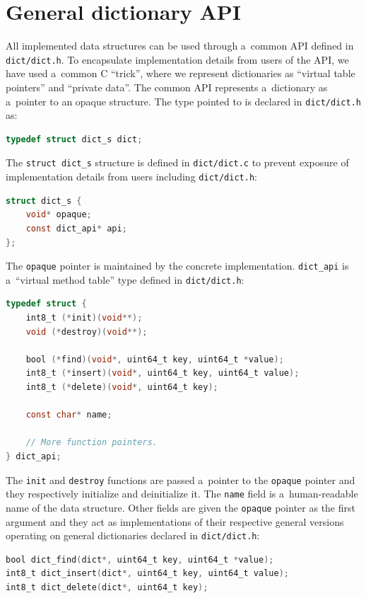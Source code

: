 \section{General dictionary API}
All implemented data structures can be used through a~common API defined
in \texttt{dict/dict.h}. To encapsulate implementation details from
users of the API, we have used a~common C ``trick'', where we represent
dictionaries as ``virtual table pointers'' and ``private data''.
The common API represents a~dictionary as a~pointer to an opaque structure.
The type pointed to is declared in \texttt{dict/dict.h} as:
\begin{lstlisting}[language=C]
typedef struct dict_s dict;
\end{lstlisting}

The \texttt{struct dict\_s} structure is defined in \texttt{dict/dict.c}
to prevent exposure of implementation details from users including
\texttt{dict/dict.h}:
\begin{lstlisting}[language=C]
struct dict_s {
	void* opaque;
	const dict_api* api;
};
\end{lstlisting}

The \texttt{opaque} pointer is maintained by the concrete implementation.
\texttt{dict\_api} is a~``virtual method table'' type defined in
\texttt{dict/dict.h}:

\begin{lstlisting}[language=C]
typedef struct {
	int8_t (*init)(void**);
	void (*destroy)(void**);

	bool (*find)(void*, uint64_t key, uint64_t *value);
	int8_t (*insert)(void*, uint64_t key, uint64_t value);
	int8_t (*delete)(void*, uint64_t key);

	const char* name;

	// More function pointers.
} dict_api;
\end{lstlisting}

The \texttt{init} and \texttt{destroy} functions are passed a~pointer to the
\texttt{opaque} pointer and they respectively initialize and deinitialize it.
The \texttt{name} field is a~human-readable name of the data structure.
Other fields are given the \texttt{opaque} pointer as the first argument
and they act as implementations of their respective general versions operating
on general dictionaries declared in \texttt{dict/dict.h}:

\begin{lstlisting}[language=C]
bool dict_find(dict*, uint64_t key, uint64_t *value);
int8_t dict_insert(dict*, uint64_t key, uint64_t value);
int8_t dict_delete(dict*, uint64_t key);
\end{lstlisting}

